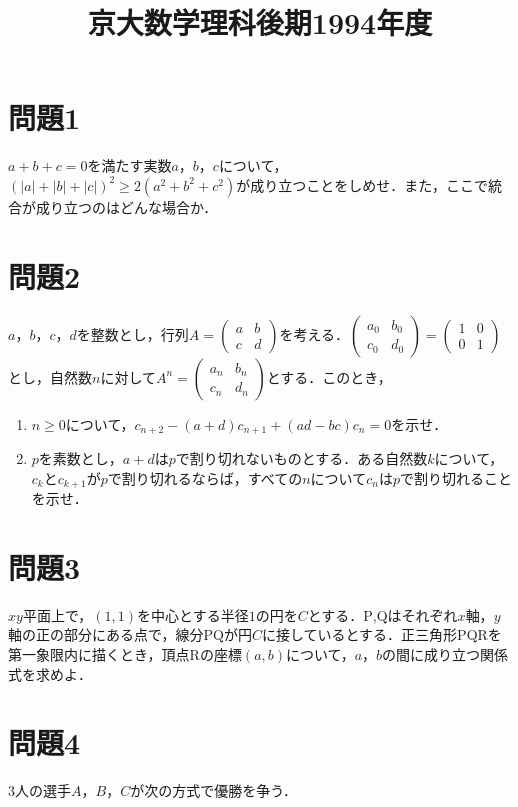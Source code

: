 \documentclass[unicode,12pt, A4j]{ltjsarticle}%
\title{京大数学理科後期1994年度}
\author{}
\date{}
\begin{document}
\maketitle

\section{問題1}
$a+b+c=0$を満たす実数$a$，$b$，$c$について，$(|a|+|b|+|c|)^2\ge 2(a^2+b^2+c^2)$が成り立つことをしめせ．また，ここで統合が成り立つのはどんな場合か．


\section{問題2}
$a$，$b$，$c$，$d$を整数とし，行列$A=\begin{pmatrix} a&b \\ c&d\end{pmatrix}$を考える．$\begin{pmatrix} a_0&b_0 \\ c_0&d_0\end{pmatrix}=\begin{pmatrix} 1&0 \\ 0&1\end{pmatrix}$とし，自然数$n$に対して$A^n=\begin{pmatrix} a_n&b_n \\ c_n&d_n\end{pmatrix}$とする．このとき，

\begin{enumerate}
 \item $n\ge 0$について，$c_{n+2}-(a+d)c_{n+1}+(ad-bc)c_n=0$を示せ．
 \item $p$を素数とし，$a+d$は$p$で割り切れないものとする．ある自然数$k$について，$c_k$と$c_{k+1}$が$p$で割り切れるならば，すべての$n$について$c_n$は$p$で割り切れることを示せ．
\end{enumerate}

\section{問題3}
$xy$平面上で，$(1,1)$を中心とする半径$1$の円を$C$とする．$\mathrm{P}$,$\mathrm{Q}$はそれぞれ$x$軸，$y$軸の正の部分にある点で，線分$\mathrm{PQ}$が円$C$に接しているとする．正三角形$\mathrm{PQR}$を第一象限内に描くとき，頂点$\mathrm{R}$の座標$(a,b)$について，$a$，$b$の間に成り立つ関係式を求めよ．


\section{問題4}
$3$人の選手$A$，$B$，$C$が次の方式で優勝を争う．
\end{document}
